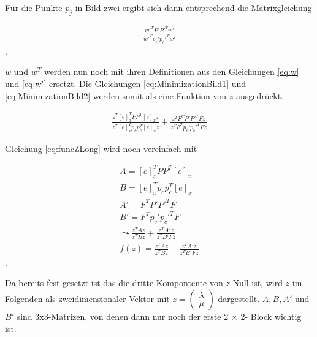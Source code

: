 Für die Punkte $p_j$ in Bild zwei ergibt sich dann entsprechend die Matrixgleichung

\begin{gather}
	\frac{w'^TP'P'^Tw'}{w'^Tp_c'p_c'^Tw'}\label{eq:MinimizationBild2}
\end{gather} .


$w$ und $w^T$ werden nun noch mit ihren Definitionen aus den Gleichungen \ref{eq:w} und \ref{eq:w'} ersetzt. Die Gleichungen \ref{eq:MinimizationBild1} und \ref{eq:MinimizationBild2} werden somit als eine Funktion von $z$ ausgedrückt\cite{ZZ}. 


\begin{gather}
	\frac{z^T[e]_x^TPP^T[e]_xz}{z^T[e]_x^Tp_cp_c^T[e]_xz}+\frac{z^TF^TP'P'^TFz}{z^TF^Tp_c'p_c'^TFz} \label{eq:funcZLong}
\end{gather}

Gleichung \ref{eq:funcZLong} wird noch vereinfach mit

\begin{gather}
	A = [e]_x^TPP^T[e]_x\\
	B=[e]_x^Tp_cp_c^T[e]_x\\
	A'=F^TP'P'^TF\\
	B'= F^Tp_c'p_c'^TF\\
	\leadsto 
	\frac{z^TAz}{z^TBz}+\frac{z^TA'z}{z^TB'Fz}\\
	f(z) = \frac{z^TAz}{z^TBz}+\frac{z^TA'z}{z^TB'Fz}\label{eq:PolynomRec}
\end{gather}
.

Da bereits fest gesetzt ist das die dritte Kompontente von $z$ Null ist, wird $z$ im Folgenden als zweidimensionaler Vektor mit $z = \begin{pmatrix}
\lambda\\ \mu\end{pmatrix}$ dargestellt. $A,B,A'$ und $B'$ sind 3x3-Matrizen, von denen dann nur noch der erste 2 $\times$ 2- Block wichtig ist.\\

